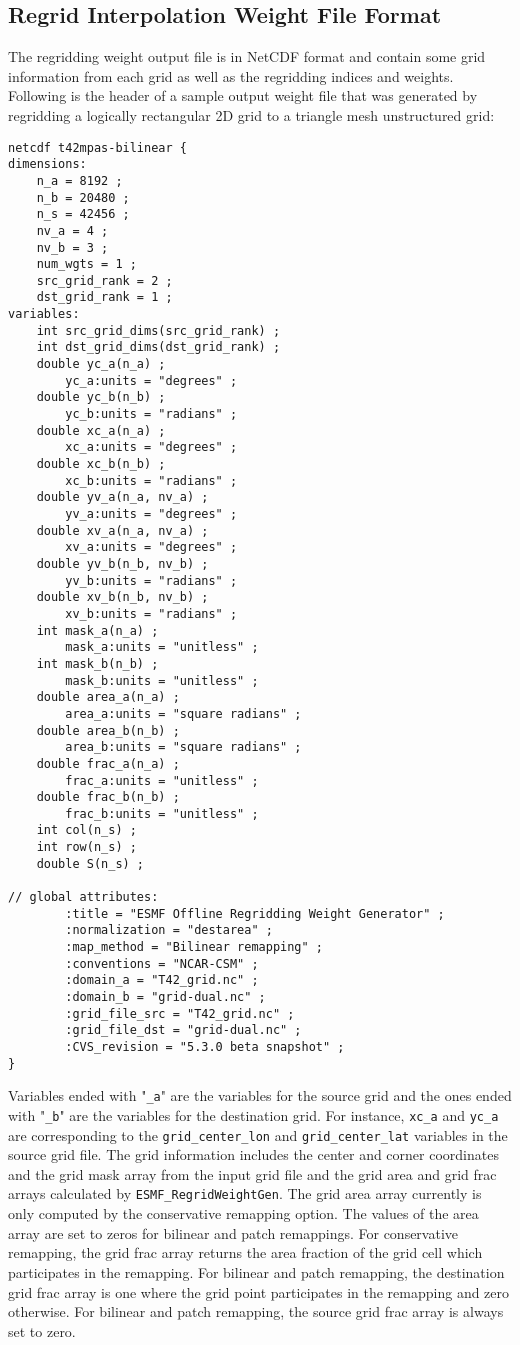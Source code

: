 \subsection{Regrid Interpolation Weight File Format}\label{sec:weightfileformat}

The regridding weight output file is in NetCDF format and contain some grid
information from each grid as well as the regridding indices and weights.
Following is the header of a sample output weight file that was generated by 
regridding a logically rectangular 2D grid to a triangle mesh unstructured grid:

\begin{verbatim}
netcdf t42mpas-bilinear {
dimensions:
	n_a = 8192 ;
	n_b = 20480 ;
	n_s = 42456 ;
	nv_a = 4 ;
	nv_b = 3 ;
	num_wgts = 1 ;
	src_grid_rank = 2 ;
	dst_grid_rank = 1 ;
variables:
	int src_grid_dims(src_grid_rank) ;
	int dst_grid_dims(dst_grid_rank) ;
	double yc_a(n_a) ;
		yc_a:units = "degrees" ;
	double yc_b(n_b) ;
		yc_b:units = "radians" ;
	double xc_a(n_a) ;
		xc_a:units = "degrees" ;
	double xc_b(n_b) ;
		xc_b:units = "radians" ;
	double yv_a(n_a, nv_a) ;
		yv_a:units = "degrees" ;
	double xv_a(n_a, nv_a) ;
		xv_a:units = "degrees" ;
	double yv_b(n_b, nv_b) ;
		yv_b:units = "radians" ;
	double xv_b(n_b, nv_b) ;
		xv_b:units = "radians" ;
	int mask_a(n_a) ;
		mask_a:units = "unitless" ;
	int mask_b(n_b) ;
		mask_b:units = "unitless" ;
	double area_a(n_a) ;
		area_a:units = "square radians" ;
	double area_b(n_b) ;
		area_b:units = "square radians" ;
	double frac_a(n_a) ;
		frac_a:units = "unitless" ;
	double frac_b(n_b) ;
		frac_b:units = "unitless" ;
	int col(n_s) ;
	int row(n_s) ;
	double S(n_s) ;

// global attributes:
		:title = "ESMF Offline Regridding Weight Generator" ;
		:normalization = "destarea" ;
		:map_method = "Bilinear remapping" ;
		:conventions = "NCAR-CSM" ;
		:domain_a = "T42_grid.nc" ;
		:domain_b = "grid-dual.nc" ;
		:grid_file_src = "T42_grid.nc" ;
		:grid_file_dst = "grid-dual.nc" ;
		:CVS_revision = "5.3.0 beta snapshot" ;
}
\end{verbatim}

Variables ended with "{\tt \_a}" are the variables for the source grid and the ones ended with "{\tt \_b}"
are the variables for the destination grid. For instance, {\tt xc\_a} and {\tt yc\_a} are corresponding
to the {\tt grid\_center\_lon} and {\tt grid\_center\_lat} variables in the source grid file.
The grid information includes the center and corner coordinates and the grid mask 
array from the input grid file and
the grid area and grid frac arrays calculated by {\tt ESMF\_RegridWeightGen}. 
The grid area array currently is only
computed by the conservative remapping option. The values of the area
array are set to zeros for bilinear
and patch remappings.
For conservative remapping, the grid frac array 
returns the area fraction of the grid cell which participates in the remapping. 
For bilinear and patch remapping, the
destination grid frac array is one where the grid point participates in the remapping
and zero otherwise. For bilinear and patch remapping, the source grid frac array
is always set to zero.

